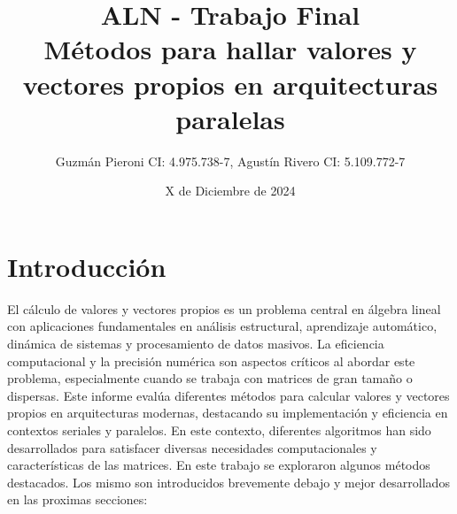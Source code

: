 \documentclass{article}
\begin{document}
\title{ALN - Trabajo Final 
\\Métodos para hallar valores y vectores propios en
arquitecturas paralelas}
\author{Guzmán Pieroni CI: 4.975.738-7, Agustín Rivero CI: 5.109.772-7}
\date{X de Diciembre de 2024}
\maketitle

\section{Introducción}
El cálculo de valores y vectores propios es un problema central en álgebra lineal con aplicaciones fundamentales en análisis estructural, aprendizaje automático, dinámica de sistemas y procesamiento de datos masivos. La eficiencia computacional y la precisión numérica son aspectos críticos al abordar este problema, especialmente cuando se trabaja con matrices de gran tamaño o dispersas.
Este informe evalúa diferentes métodos para calcular valores y vectores propios en arquitecturas modernas, destacando su implementación y eficiencia en contextos seriales y paralelos.
En este contexto, diferentes algoritmos han sido desarrollados para satisfacer diversas necesidades computacionales y características de las matrices. En este trabajo se exploraron algunos métodos destacados. Los mismo son introducidos brevemente debajo y mejor desarrollados en las proximas secciones:
\end{document}
